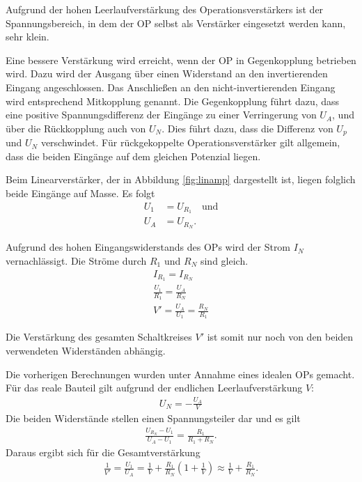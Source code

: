 Aufgrund der hohen Leerlaufverstärkung des Operationsverstärkers ist der Spannungsbereich, in dem der OP selbst als Verstärker eingesetzt werden kann, sehr klein.

Eine bessere Verstärkung wird erreicht, wenn der OP in Gegenkopplung betrieben wird.
Dazu wird der Ausgang über einen Widerstand an den invertierenden Eingang angeschlossen.
Das Anschließen an den nicht-invertierenden Eingang wird entsprechend Mitkopplung genannt.
Die Gegenkopplung führt dazu, dass eine positive Spannungsdifferenz der Eingänge zu einer Verringerung von $U_A$, und über die Rückkopplung auch von $U_N$.
Dies führt dazu, dass die Differenz von $U_p$ und $U_N$ verschwindet.
Für rückgekoppelte Operationsverstärker gilt allgemein, dass die beiden Eingänge auf dem gleichen Potenzial liegen.

Beim Linearverstärker, der in Abbildung \ref{fig:linamp} dargestellt ist, liegen folglich beide Eingänge auf Masse.
Es folgt
\begin{align}
	U_1 &= U_{R_1} \quad \text{und} \\
	U_A &= U_{R_N}.
\end{align}

Aufgrund des hohen Eingangswiderstands des OPs wird der Strom $I_N$ vernachlässigt.
Die Ströme durch $R_1$ und $R_N$ sind gleich.
\begin{align}
	I_{R_1} = I_{R_N} \\
	\frac{U_1}{R_1} = \frac{U_A}{R_N} \\
	V' = \frac{U_A}{U_1} = \frac{R_N}{R_1}
\end{align}

Die Verstärkung des gesamten Schaltkreises $V'$ ist somit nur noch von den beiden verwendeten Widerständen abhängig.

Die vorherigen Berechnungen wurden unter Annahme eines idealen OPs gemacht.
Für das reale Bauteil gilt aufgrund der endlichen Leerlaufverstärkung $V$:
\begin{align}
	U_N = -\frac{U_A}{V}
\end{align}
Die beiden Widerstände stellen einen Spannungsteiler dar und es gilt
\begin{align}
	\frac{U_{R_N} - U_1}{U_A - U_1} = \frac{R_1}{R_1 + R_N}.
\end{align}
Daraus ergibt sich für die Gesamtverstärkung
\begin{align}
	\frac{1}{V'} = \frac{U_1}{U_A} = \frac{1}{V} + \frac{R_1}{R_N} \left(1 + \frac{1}{V}\right) \approx \frac{1}{V} + \frac{R_1}{R_N}.
\end{align}

